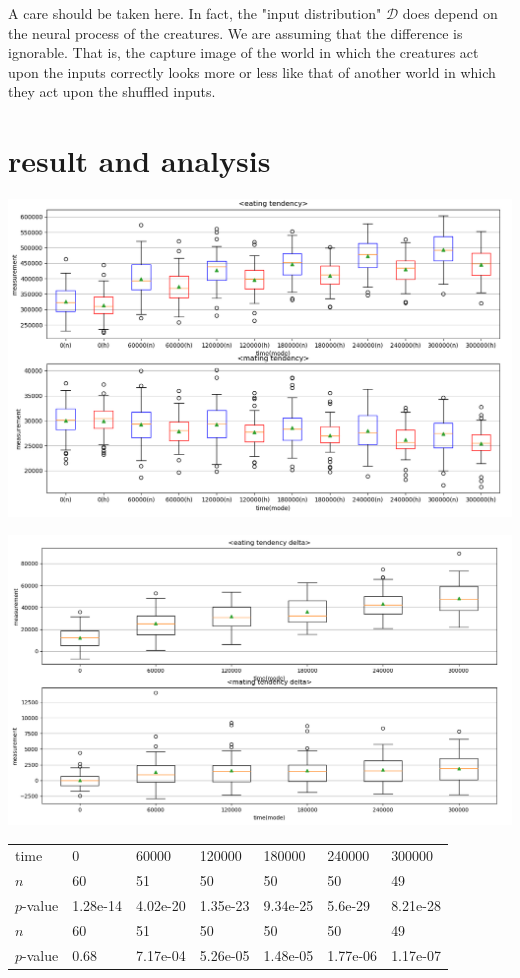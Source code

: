 \documentclass{amsart}
\theoremstyle{definition}
\theoremstyle{remark}
\numberwithin{equation}{section}
\begin{document}
A care should be taken here. In fact, the "input distribution" $\mathcal{D}$ does depend on the neural process of the creatures. We are assuming that the difference is ignorable. That is, the capture image of the world in which the creatures act upon the inputs correctly looks more or less like that of another world in which they act upon the shuffled inputs. 


\section{result and analysis}
\begin{center}
\includegraphics[scale=0.3]{images/main.png}
\end{center}
\begin{center}
\includegraphics[scale=0.3]{images/main2.png}
\end{center}
\begin{table}[htb]
\begin{tabular}{lllllll}
time & 0 & 60000 & 120000 & 180000&240000&300000 \\
$n$&60&51&50&50&50&49 \\
$p$-value&1.28e-14&4.02e-20&1.35e-23&9.34e-25&5.6e-29&8.21e-28\\
$n$&60&51&50&50&50&49  \\
$p$-value&0.68&7.17e-04&5.26e-05&1.48e-05&1.77e-06&1.17e-07  
  
\end{tabular}
\end{table}
\end{document}
